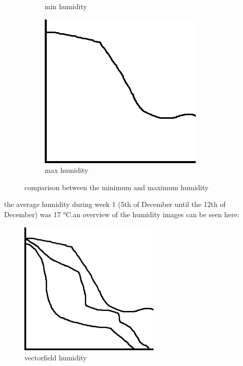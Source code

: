\begin{figure}[hbt!]
\begin{subfigure}{0.3\textwidth}
\caption{min humidity}  
\end{subfigure} 
\begin{subfigure}{0.3\textwidth} 
\includegraphics[width=0.9\linewidth]{reports/current_report/images/average_graph_humidity.png}  
\caption{max humidity}  
\end{subfigure} 
\caption{comparison between the minimum and maximum humidity}  
\end{figure} 
\FloatBarrier  
the average humidity during week 1 (5th of December until the 12th of December) was 17 °C.an overview of the humidity images can be seen here:\begin{figure}
\includegraphics[width=0.6\textwidth]{reports/current_report/images/combined_graph_humidity.png}  
\caption{vectorfield humidity}  
\end{figure} 
\FloatBarrier  
